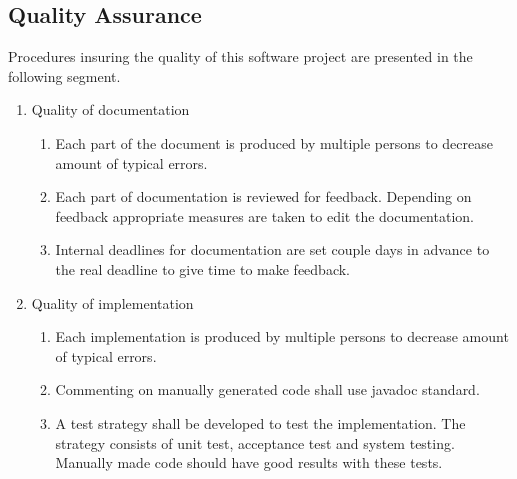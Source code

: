 \subsection{Quality Assurance}
Procedures insuring the quality of this software project are presented in the following segment.
\begin{enumerate}
	\item Quality of documentation
	\begin{enumerate}
		\item Each part of the document is produced by multiple persons to decrease amount of typical errors.
		\item Each part of documentation is reviewed for feedback. Depending on feedback appropriate measures are taken to edit the documentation.
		\item Internal deadlines for documentation are set couple days in advance to the real deadline to give time to make feedback.
	\end{enumerate}
	\item Quality of implementation
	\begin{enumerate}
		\item Each implementation is produced by multiple persons to decrease amount of typical errors.
		\item Commenting on manually generated code shall use javadoc standard.
		\item A test strategy shall be developed to test the implementation. The strategy consists of unit test, acceptance test and system testing. Manually made code should have good results with these tests.
	\end{enumerate}
\end{enumerate}